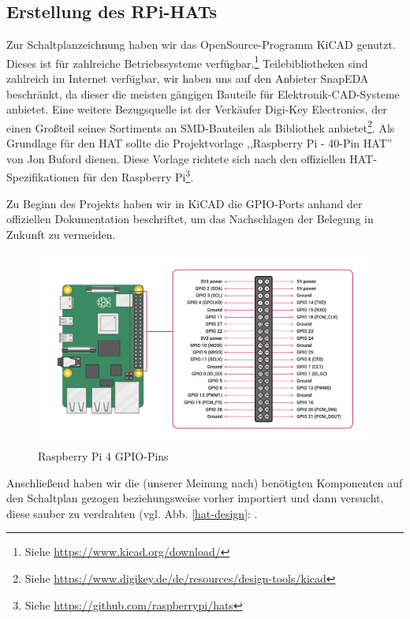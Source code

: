 \subsection{Erstellung des RPi-HATs}\label{hw_hat}
Zur Schaltplanzeichnung haben wir das OpenSource-Programm KiCAD genutzt.
Dieses ist für zahlreiche Betriebssysteme verfügbar.\footnote{Siehe \url{https://www.kicad.org/download/}} 
Teilebibliotheken sind zahlreich im Internet verfügbar, wir haben uns auf den Anbieter SnapEDA beschränkt, da dieser die meisten gängigen Bauteile für Elektronik-CAD-Systeme anbietet. 
Eine weitere Bezugsquelle ist der Verkäufer Digi-Key Electronics, der einen Großteil seines Sortiments an SMD-Bauteilen als Bibliothek anbietet\footnote{Siehe \url{https://www.digikey.de/de/resources/design-tools/kicad}}. 
Als Grundlage für den HAT sollte die Projektvorlage ,,Raspberry Pi - 40-Pin HAT'' von Jon Buford dienen.
Diese Vorlage richtete sich nach den offiziellen HAT-Spezifikationen für den Raspberry Pi\footnote{Siehe \url{https://github.com/raspberrypi/hats}}.\par
\noindent Zu Beginn des Projekts haben wir in KiCAD die GPIO-Ports anhand der offiziellen Dokumentation beschriftet, um das Nachschlagen der Belegung in Zukunft zu vermeiden.
\begin{figure}[H]
	\includegraphics[width=1\textwidth]{img/GPIO-Pinout-Diagram-2.png}
	\caption[Raspberry Pi 4 GPIO-Pins]{Raspberry Pi 4 GPIO-Pins}
	\label{rpi-gpio-pins}
\end{figure}
\par
\noindent Anschließend haben wir die (unserer Meinung nach) benötigten Komponenten auf den Schaltplan gezogen beziehungsweise vorher importiert und dann versucht, diese sauber zu verdrahten (vgl. Abb. \ref{hat-design}: .\par
